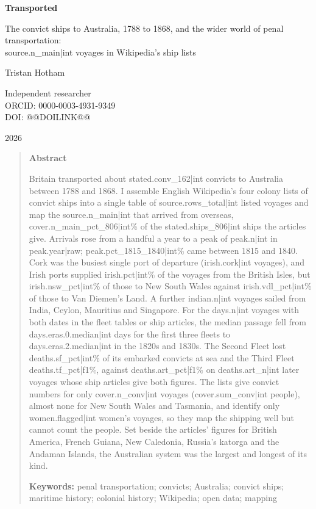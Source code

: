\documentclass[11pt,a4paper]{article}
\begin{document}
\begin{center}
{\Large\bfseries Transported\par}
\vspace{0.4em}
{\large The convict ships to Australia, 1788 to 1868, and the wider world of penal transportation:\\{{source.n_main|int}} voyages in Wikipedia's ship lists\par}
\vspace{1.2em}
{\large Tristan Hotham\par}
\vspace{0.3em}
{\small Independent researcher\\
ORCID: 0000-0003-4931-9349\\
DOI: @@DOILINK@@\par}
\vspace{0.8em}
2026
\end{center}

\begin{quote}
\small
\begin{center}\textbf{Abstract}\end{center}
Britain transported about {{stated.conv_162|int}} convicts to Australia between 1788 and 1868. I assemble English Wikipedia's four colony lists of convict ships into a single table of {{source.rows_total|int}} listed voyages and map the {{source.n_main|int}} that arrived from overseas, {{cover.n_main_pct_806|int}}\% of the {{stated.ships_806|int}} ships the articles give. Arrivals rose from a handful a year to a peak of {{peak.n|int}} in {{peak.year|raw}}; {{peak.pct_1815_1840|int}}\% came between 1815 and 1840. Cork was the busiest single port of departure ({{irish.cork|int}} voyages), and Irish ports supplied {{irish.pct|int}}\% of the voyages from the British Isles, but {{irish.nsw_pct|int}}\% of those to New South Wales against {{irish.vdl_pct|int}}\% of those to Van Diemen's Land. A further {{indian.n|int}} voyages sailed from India, Ceylon, Mauritius and Singapore. For the {{days.n|int}} voyages with both dates in the fleet tables or ship articles, the median passage fell from {{days.eras.0.median|int}} days for the first three fleets to {{days.eras.2.median|int}} in the 1820s and 1830s. The Second Fleet lost {{deaths.sf_pct|int}}\% of its embarked convicts at sea and the Third Fleet {{deaths.tf_pct|f1}}\%, against {{deaths.art_pct|f1}}\% on {{deaths.art_n|int}} later voyages whose ship articles give both figures. The lists give convict numbers for only {{cover.n_conv|int}} voyages ({{cover.sum_conv|int}} people), almost none for New South Wales and Tasmania, and identify only {{women.flagged|int}} women's voyages, so they map the shipping well but cannot count the people. Set beside the articles' figures for British America, French Guiana, New Caledonia, Russia's katorga and the Andaman Islands, the Australian system was the largest and longest of its kind.

\textbf{Keywords:} penal transportation; convicts; Australia; convict ships; maritime history; colonial history; Wikipedia; open data; mapping
\end{quote}
\end{document}
